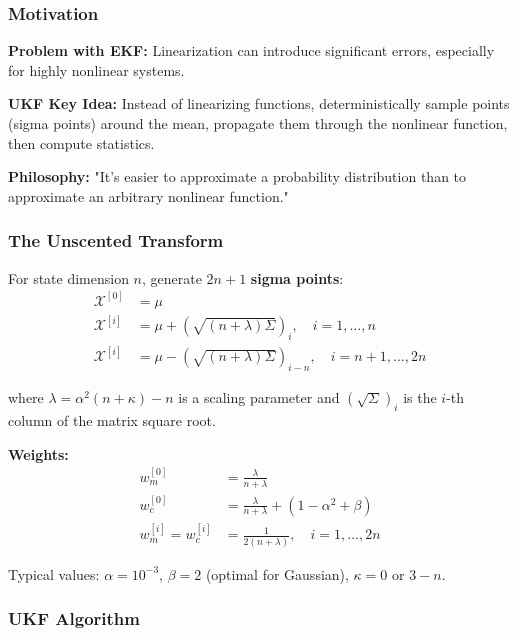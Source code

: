 \subsubsection{Motivation}

\textbf{Problem with EKF:} Linearization can introduce significant errors, especially for highly nonlinear systems.

\textbf{UKF Key Idea:} Instead of linearizing functions, deterministically sample points (sigma points) around the mean, propagate them through the nonlinear function, then compute statistics.

\textbf{Philosophy:} "It's easier to approximate a probability distribution than to approximate an arbitrary nonlinear function."

\subsubsection{The Unscented Transform}

For state dimension $n$, generate $2n+1$ \textbf{sigma points}:
\begin{align}
\mathcal{X}^{[0]} &= \mu \\
\mathcal{X}^{[i]} &= \mu + \left(\sqrt{(n+\lambda)\Sigma}\right)_i, \quad i = 1, \ldots, n \\
\mathcal{X}^{[i]} &= \mu - \left(\sqrt{(n+\lambda)\Sigma}\right)_{i-n}, \quad i = n+1, \ldots, 2n
\end{align}

where $\lambda = \alpha^2(n + \kappa) - n$ is a scaling parameter and $\left(\sqrt{\Sigma}\right)_i$ is the $i$-th column of the matrix square root.

\textbf{Weights:}
\begin{align}
w_m^{[0]} &= \frac{\lambda}{n + \lambda} \\
w_c^{[0]} &= \frac{\lambda}{n + \lambda} + (1 - \alpha^2 + \beta) \\
w_m^{[i]} = w_c^{[i]} &= \frac{1}{2(n + \lambda)}, \quad i = 1, \ldots, 2n
\end{align}

Typical values: $\alpha = 10^{-3}$, $\beta = 2$ (optimal for Gaussian), $\kappa = 0$ or $3-n$.

\subsubsection{UKF Algorithm}

